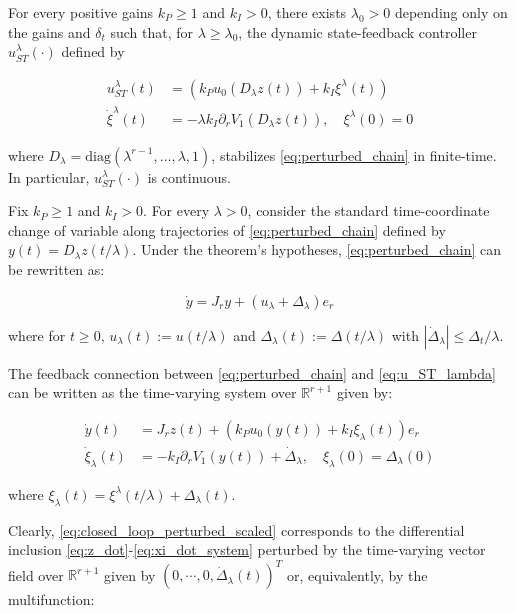 \begin{theorem}
    For every positive gains \(k_P \geq 1\) and \(k_I > 0\), there exists \(\lambda_0 > 0\) depending only 
    on the gains and \(\delta_t\) such that, for \(\lambda \geq \lambda_0\), the dynamic state-feedback 
    controller \(u_{ST}^{\lambda}(\cdot)\) defined by

    \begin{align}
        u_{ST}^{\lambda}(t) &= \left(k_P u_0(D_{\lambda} z(t)) + k_I \xi^{\lambda}(t)\right) \label{eq:u_ST_lambda} \\
        \dot{\xi}^{\lambda}(t) &= -\lambda k_I \partial_r V_1(D_{\lambda} z(t)), \quad \xi^{\lambda}(0) = 0
    \end{align}

    where \(D_{\lambda} = \text{diag}(\lambda^{r-1}, \ldots, \lambda, 1)\), stabilizes \ref{eq:perturbed_chain} 
    in finite-time. In particular, \(u_{ST}^{\lambda}(\cdot)\) is continuous.
\end{theorem}

Fix \(k_P \geq 1\) and \(k_I > 0\). For every \(\lambda > 0\), consider the standard time-coordinate change 
of variable along trajectories of \ref{eq:perturbed_chain} defined by \(y(t) = D_{\lambda} z(t/\lambda)\). 
Under the theorem's hypotheses, \ref{eq:perturbed_chain} can be rewritten as:

\begin{equation}
    \dot{y} = J_r y + (u_{\lambda} + \Delta_{\lambda}) e_r
\end{equation}

where for \(t \geq 0\), \(u_{\lambda}(t) := u(t/\lambda)\) and \(\Delta_{\lambda}(t) := \Delta(t/\lambda)\) with \(|\dot{\Delta}_{\lambda}| \leq \Delta_t/\lambda\).

The feedback connection between \ref{eq:perturbed_chain} and \ref{eq:u_ST_lambda} can be written as the 
time-varying system over \(\mathbb{R}^{r+1}\) given by:

\begin{align}
    \dot{y}(t) &= J_r z(t) + \left(k_P u_0(y(t)) + k_I \xi_{\lambda}(t)\right) e_r \\
    \dot{\xi}_{\lambda}(t) &= -k_I \partial_r V_1(y(t)) + \dot{\Delta}_{\lambda}, \quad \xi_{\lambda}(0) = \Delta_{\lambda}(0)
    \label{eq:closed_loop_perturbed_scaled}
\end{align}

where \(\xi_{\lambda}(t) = \xi^{\lambda}(t/\lambda) + \Delta_{\lambda}(t)\).

Clearly, \ref{eq:closed_loop_perturbed_scaled} corresponds to the differential 
inclusion \ref{eq:z_dot}-\ref{eq:xi_dot_system} perturbed by the time-varying vector field 
over \(\mathbb{R}^{r+1}\) given by \((0, \cdots, 0, \dot{\Delta}_{\lambda}(t))^T\) or, equivalently, 
by the multifunction:

